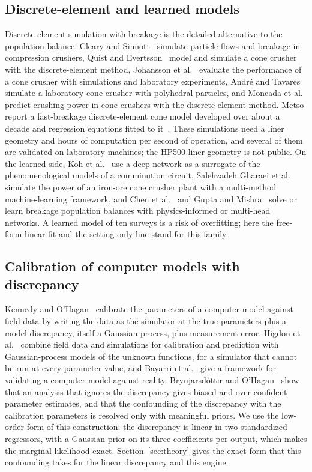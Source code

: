 \documentclass[journal]{IEEEtran}
\begin{document}
\subsection{Discrete-element and learned models}

Discrete-element simulation with breakage is the detailed alternative to the population balance. Cleary and
Sinnott~\cite{cleary} simulate particle flows and breakage in compression crushers, Quist and Evertsson~\cite{quist} model
and simulate a cone crusher with the discrete-element method, Johansson et al.~\cite{johansson} evaluate the performance
of a cone crusher with simulations and laboratory experiments, Andr\'e and Tavares~\cite{andre} simulate a laboratory cone
crusher with polyhedral particles, and Moncada et al.~\cite{moncada} predict crushing power in cone crushers with the
discrete-element method. Metso report a fast-breakage discrete-element cone model developed over about a decade and
regression equations fitted to it~\cite{metso}. These simulations need a liner geometry and hours of computation per second of
operation, and several of them are validated on laboratory machines; the HP500 liner geometry is not public. On the learned side, Koh et
al.~\cite{koh} use a deep network as a surrogate of the phenomenological models of a comminution circuit, Salehzadeh Gharaei et
al.~\cite{gharaei} simulate the power of an iron-ore cone crusher plant with a multi-method machine-learning framework,
and Chen et al.~\cite{chen} and Gupta and Mishra~\cite{gupta} solve or learn breakage population balances with
physics-informed or multi-head networks. A learned model of ten surveys is a risk of overfitting; here the free-form
linear fit and the setting-only line stand for this family.

\subsection{Calibration of computer models with discrepancy}

Kennedy and O'Hagan~\cite{ko} calibrate the parameters of a computer model against field data by writing the data as the
simulator at the true parameters plus a model discrepancy, itself a Gaussian process, plus measurement error. Higdon et
al.~\cite{higdon} combine field data and simulations for calibration and prediction with Gaussian-process models of the
unknown functions, for a simulator that cannot be run at every parameter value, and Bayarri et al.~\cite{bayarri} give a
framework for validating a computer model against reality. Brynjarsd\'ottir and O'Hagan~\cite{brynj} show that an
analysis that ignores the discrepancy gives biased and over-confident parameter estimates, and that the confounding of
the discrepancy with the calibration parameters is resolved only with meaningful priors. We use the low-order form of
this construction: the discrepancy is linear in two standardized regressors, with a Gaussian prior on its three
coefficients per output, which makes the marginal likelihood exact. Section~\ref{sec:theory} gives the exact form that this confounding takes for the
linear discrepancy and this engine.
\end{document}
